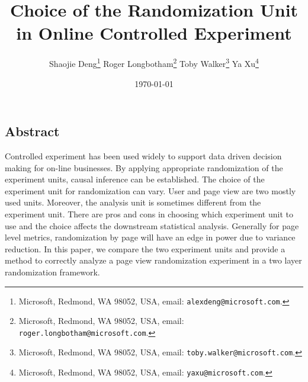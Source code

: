 \documentclass[11pt]{asaproc}
\begin{document}
\date{}

\title{\Large\bf Choice of the Randomization Unit in Online Controlled Experiment}


\author{Shaojie Deng\footnote{Microsoft, Redmond, WA 98052, USA, email: {\tt alexdeng@microsoft.com}.}\;\;\;\; Roger Longbotham\footnote{Microsoft, Redmond, WA 98052, USA, email: {\tt roger.longbotham@microsoft.com}.}\;\;\;\; Toby Walker\footnote{Microsoft, Redmond, WA 98052, USA, email: {\tt toby.walker@microsoft.com}.}\;\;\;\; Ya Xu\footnote{Microsoft, Redmond, WA 98052, USA, email: {\tt yaxu@microsoft.com}.} } \normalsize

\date{ \today}
\maketitle

\thispagestyle{empty}

\subsection*{Abstract}
Controlled experiment has been used widely to support data driven decision making for on-line businesses. By applying appropriate randomization of the experiment units, causal inference can be established. The choice of the experiment unit for randomization can vary. User and page view are two mostly used units. Moreover, the analysis unit is sometimes different from the experiment unit. There are pros and cons in choosing which experiment unit to use and the choice affects the downstream statistical analysis. Generally for page level metrics, randomization by page will have an edge in power due to variance reduction. In this paper, we compare the two experiment units and provide a method to correctly analyze a page view randomization experiment in a two layer randomization framework.
     
\end{document}

